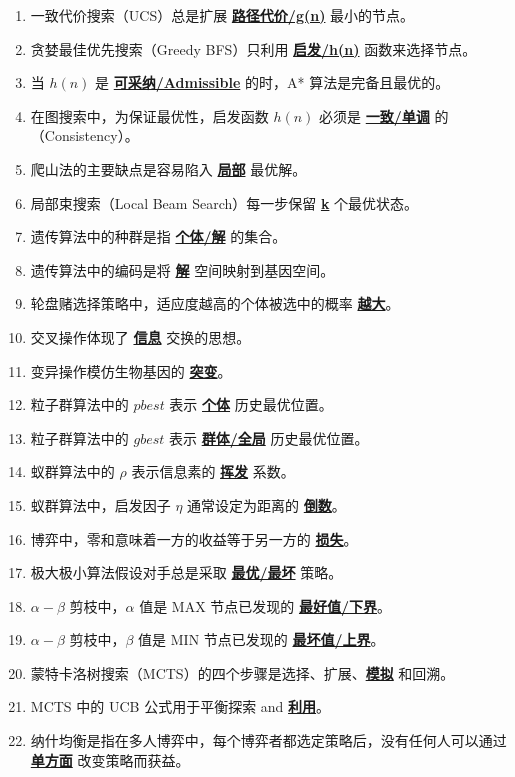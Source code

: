 \documentclass[12pt,a4paper,openany]{ctexbook}
\begin{document}
\begin{enumerate}[resume,leftmargin=2em,itemsep=1pt]
\item 一致代价搜索（UCS）总是扩展 \underline{\textbf{路径代价/g(n)}} 最小的节点。
\item 贪婪最佳优先搜索（Greedy BFS）只利用 \underline{\textbf{启发/h(n)}} 函数来选择节点。
\item 当 $h(n)$ 是 \underline{\textbf{可采纳/Admissible}} 的时，A* 算法是完备且最优的。
\item 在图搜索中，为保证最优性，启发函数 $h(n)$ 必须是 \underline{\textbf{一致/单调}} 的（Consistency）。
\item 爬山法的主要缺点是容易陷入 \underline{\textbf{局部}} 最优解。
\item 局部束搜索（Local Beam Search）每一步保留 \underline{\textbf{k}} 个最优状态。
\item 遗传算法中的种群是指 \underline{\textbf{个体/解}} 的集合。
\item 遗传算法中的编码是将 \underline{\textbf{解}} 空间映射到基因空间。
\item 轮盘赌选择策略中，适应度越高的个体被选中的概率 \underline{\textbf{越大}}。
\item 交叉操作体现了 \underline{\textbf{信息}} 交换的思想。
\item 变异操作模仿生物基因的 \underline{\textbf{突变}}。
\item 粒子群算法中的 $pbest$ 表示 \underline{\textbf{个体}} 历史最优位置。
\item 粒子群算法中的 $gbest$ 表示 \underline{\textbf{群体/全局}} 历史最优位置。
\item 蚁群算法中的 $\rho$ 表示信息素的 \underline{\textbf{挥发}} 系数。
\item 蚁群算法中，启发因子 $\eta$ 通常设定为距离的 \underline{\textbf{倒数}}。
\item 博弈中，零和意味着一方的收益等于另一方的 \underline{\textbf{损失}}。
\item 极大极小算法假设对手总是采取 \underline{\textbf{最优/最坏}} 策略。
\item $\alpha-\beta$ 剪枝中，$\alpha$ 值是 MAX 节点已发现的 \underline{\textbf{最好值/下界}}。
\item $\alpha-\beta$ 剪枝中，$\beta$ 值是 MIN 节点已发现的 \underline{\textbf{最坏值/上界}}。
\item 蒙特卡洛树搜索（MCTS）的四个步骤是选择、扩展、\underline{\textbf{模拟}} 和回溯。
\item MCTS 中的 UCB 公式用于平衡探索 and \underline{\textbf{利用}}。
\item 纳什均衡是指在多人博弈中，每个博弈者都选定策略后，没有任何人可以通过 \underline{\textbf{单方面}} 改变策略而获益。

\end{enumerate}
\end{document}

